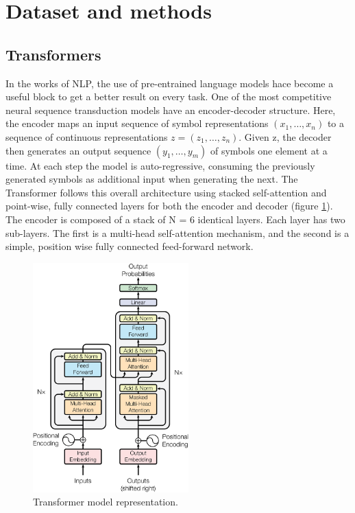 \section{Dataset and methods}

\subsection{Transformers}

In the works of NLP, the use of pre-entrained language models hace become a useful block to get a better result on every task. One of the most competitive neural sequence transduction models have an encoder-decoder structure\cite{Bahdanau_2014,Cho_2014}. Here, the encoder maps an input sequence of symbol representations $(x_1 , \dots, x_n)$ to a sequence of continuous representations $z = (z_1 , \dots, z_n )$. Given z, the decoder then generates an output sequence $(y_1 , \dots, y_m )$ of symbols one element at a time. At each step the model is auto-regressive\cite{Graves_2013}, consuming the previously generated symbols as additional input when generating the next. The Transformer follows this overall architecture using stacked self-attention and point-wise, fully connected layers for both the encoder and decoder (figure \ref{fig:transformer}). The encoder is composed of a stack of N = 6 identical layers. Each layer has two sub-layers. The first is a multi-head self-attention mechanism, and the second is a simple, position wise fully connected feed-forward network.

\begin{figure}[H]
    \centering
    \includegraphics[width=6cm]{Graphics/transformer.png}
    \caption{Transformer model representation\cite{Vaswani_2017}.}
    \label{fig:transformer}
\end{figure}


